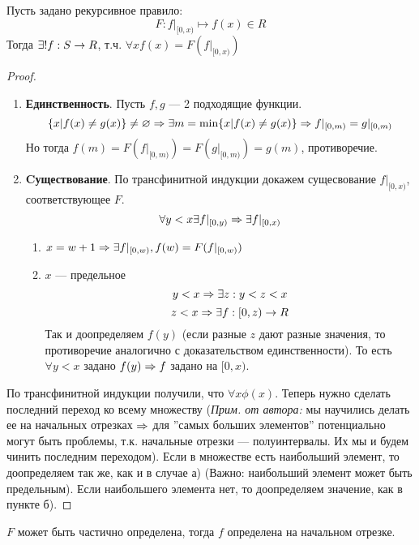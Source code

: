 
\begin{theorem}
    Пусть задано рекурсивное правило:
    \[F: f|_{[0, x)} \mapsto f(x) \in R\]
    Тогда \(\exists! f: S \rightarrow R\), т.ч. \(\forall x f(x) = F(f|_{[0, x)})\)
\end{theorem}
\begin{proof}\indent
    \begin{enumerate}
        \item[] \textbf{Единственность}. Пусть \(f, g\) --- 2 подходящие функции.
        \[\{x | f(x) \ne g(x)\} \ne \varnothing \Rightarrow \exists m = \min\{x| f(x) \ne g(x)\} \Rightarrow f|_{[0, m)} = g|_{[0, m)}\]
        Но тогда \(f(m) = F(f|_{[0, m)}) = F(g|_{[0, m)}) = g(m)\), противоречие.

        \item[] \textbf{Cуществование}. По трансфинитной индукции докажем сущесвование \(f|_{[0, x)}\), соответствующее \(F\).
        \[\forall y < x \exists f|_{[0, y)} \Rightarrow \exists f|_{[0, x)}\]
        \begin{enumerate}
            \item \(x = w + 1 \Rightarrow \exists f|_{[0, w)}, f(w) = F(f|_{[0, w)})\)
            \item \(x\) --- предельное
            \[y < x \Rightarrow \exists z: y < z < x\]
            \[z < x \Rightarrow \exists f: [0, z) \rightarrow R\]
            Так и доопределяем \(f(y)\) (если разные \(z\) дают разные значения, то противоречие аналогично с доказательством единственности). То есть \(\forall y < x\) задано \(f(y) \Rightarrow f\) задано на \([0, x)\).
        \end{enumerate}
    \end{enumerate}
    По трансфинитной индукции получили, что \(\forall x \phi(x)\). 
    Теперь нужно сделать последний переход ко всему множеству (\textit{Прим. от автора:} мы научились делать ее на начальных отрезках \(\Rightarrow\) для ''самых больших элементов'' потенциально могут быть проблемы, т.к. начальные отрезки --- полуинтервалы. Их мы и будем чинить последним переходом). Если в множестве есть наибольший элемент, то доопределяем так же, как и в случае а) (Важно: наибольший элемент может быть предельным). Если наибольшего элемента нет, то доопределяем значение, как в пункте б).
\end{proof}
\begin{theorem}
    \(F\) может быть частично определена, тогда \(f\) определена на начальном отрезке.
\end{theorem}
